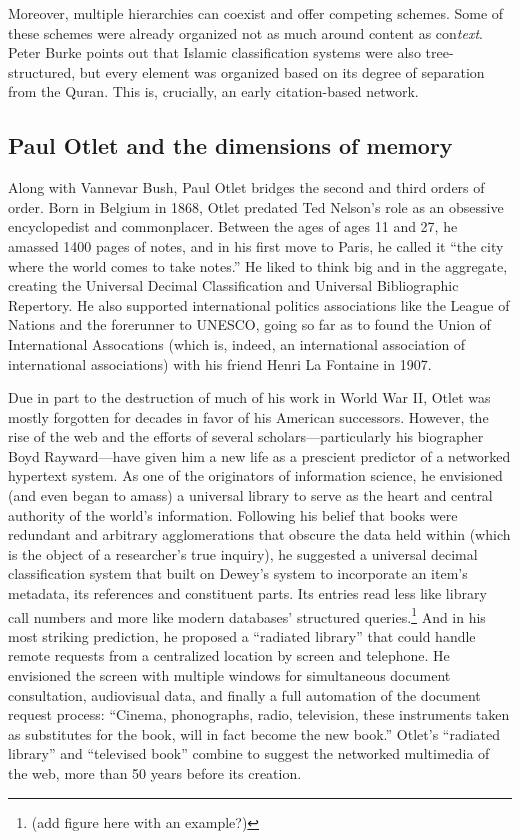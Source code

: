Moreover, multiple hierarchies can coexist and offer competing schemes. Some of these schemes were already organized not as much around content as con\emph{text}. Peter Burke points out that Islamic classification systems were also tree-structured, but every element was organized based on its degree of separation from the Quran.\autocite[94]{burke_social_2000} This is, crucially, an early citation-based network.

\subsection{Paul Otlet and the dimensions of memory}

Along with Vannevar Bush, Paul Otlet bridges the second and third orders of order. Born in Belgium in 1868, Otlet predated Ted Nelson's role as an obsessive encyclopedist and commonplacer. Between the ages of ages 11 and 27, he amassed 1400 pages of notes, and in his first move to Paris, he called it ``the city where the world comes to take notes.''\autocite{_limited_2001}  He liked to think big and in the aggregate, creating the Universal Decimal Classification and Universal Bibliographic Repertory. He also supported international politics associations like the League of Nations and the forerunner to UNESCO, going so far as to found the Union of International Assocations (which is, indeed, an international association of international associations) with his friend Henri La Fontaine in 1907.

Due in part to the destruction of much of his work in World War II, Otlet was mostly forgotten for decades in favor of his American successors. However, the rise of the web and the efforts of several scholars---particularly his biographer Boyd Rayward---have given him a new life as a prescient predictor of a networked hypertext system. As one of the originators of information science, he envisioned (and even began to amass) a universal library to serve as the heart and central authority of the world's information. Following his belief that books were redundant and arbitrary agglomerations that obscure the data held within (which is the object of a researcher's true inquiry), he suggested a universal decimal classification system that built on Dewey's system to incorporate an item's metadata, its references and constituent parts. Its entries read less like library call numbers and more like modern databases' structured queries.\footnote{(add figure here with an example?)} And in his most striking prediction, he proposed a ``radiated library'' that could handle remote requests from a centralized location by screen and telephone. He envisioned the screen with multiple windows for simultaneous document consultation, audiovisual data, and finally a full automation of the document request process: ``Cinema, phonographs, radio, television, these instruments taken as substitutes for the book, will in fact become the new book.''\autocite{van_veelen_alle_1998} Otlet's ``radiated library'' and ``televised book'' combine to suggest the networked multimedia of the web, more than 50 years before its creation.


